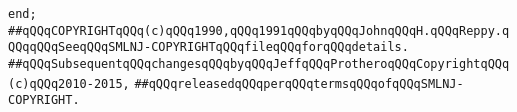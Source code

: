 \newline
\verb|end;|\newline
\newline
\newline
\newline
\newline
\verb|##qQQqCOPYRIGHTqQQq(c)qQQq1990,qQQq1991qQQqbyqQQqJohnqQQqH.qQQqReppy.qQQqqQQqSeeqQQqSMLNJ-COPYRIGHTqQQqfileqQQqforqQQqdetails.|\newline
\verb|##qQQqSubsequentqQQqchangesqQQqbyqQQqJeffqQQqProtheroqQQqCopyrightqQQq(c)qQQq2010-2015,|\newline
\verb|##qQQqreleasedqQQqperqQQqtermsqQQqofqQQqSMLNJ-COPYRIGHT.|\newline


